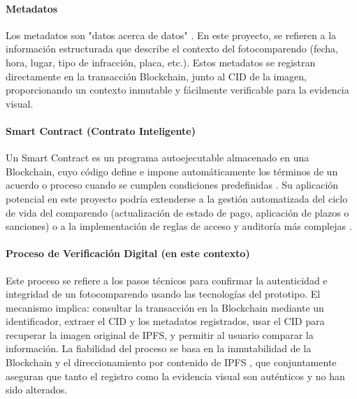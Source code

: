 \paragraph{Metadatos}  

Los metadatos son "datos acerca de datos" \parencite{gilliland2008setting}. En este proyecto, se refieren a la información estructurada que describe el contexto del fotocomparendo (fecha, hora, lugar, tipo de infracción, placa, etc.). Estos metadatos se registran directamente en la transacción Blockchain, junto al CID de la imagen, proporcionando un contexto inmutable y fácilmente verificable para la evidencia visual. 

\paragraph{Smart Contract (Contrato Inteligente)} 

Un Smart Contract es un programa autoejecutable almacenado en una Blockchain, cuyo código define e impone automáticamente los términos de un acuerdo o proceso cuando se cumplen condiciones predefinidas \parencite{szabo1997smart, wood2014ethereum}. Su aplicación potencial en este proyecto podría extenderse a la gestión automatizada del ciclo de vida del comparendo (actualización de estado de pago, aplicación de plazos o sanciones) o a la implementación de reglas de acceso y auditoría más complejas \parencite{buterin2014next}. 

\paragraph{Proceso de Verificación Digital (en este contexto)}  

Este proceso se refiere a los pasos técnicos para confirmar la autenticidad e integridad de un fotocomparendo usando las tecnologías del prototipo. El mecanismo implica: consultar la transacción en la Blockchain mediante un identificador, extraer el CID y los metadatos registrados, usar el CID para recuperar la imagen original de IPFS, y permitir al usuario comparar la información. La fiabilidad del proceso se basa en la inmutabilidad de la Blockchain \parencite{nakamoto2008bitcoin} y el direccionamiento por contenido de IPFS \parencite{benet2014ipfs}, que conjuntamente aseguran que tanto el registro como la evidencia visual son auténticos y no han sido alterados. 